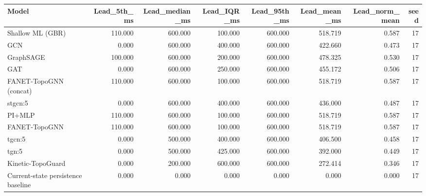 \begin{tabular}{lrrrrrrr}
\toprule
Model & Lead\_5th\_ms & Lead\_median\_ms & Lead\_IQR\_ms & Lead\_95th\_ms & Lead\_mean\_ms & Lead\_norm\_mean & seed \\
\midrule
Shallow ML (GBR) & 110.000 & 600.000 & 100.000 & 600.000 & 518.719 & 0.587 & 17 \\
GCN & 0.000 & 600.000 & 400.000 & 600.000 & 422.660 & 0.473 & 17 \\
GraphSAGE & 100.000 & 600.000 & 200.000 & 600.000 & 478.325 & 0.530 & 17 \\
GAT & 0.000 & 600.000 & 250.000 & 600.000 & 455.172 & 0.506 & 17 \\
FANET-TopoGNN (concat) & 110.000 & 600.000 & 100.000 & 600.000 & 518.719 & 0.587 & 17 \\
stgcn:5 & 0.000 & 600.000 & 400.000 & 600.000 & 436.000 & 0.487 & 17 \\
PI+MLP & 110.000 & 600.000 & 100.000 & 600.000 & 518.719 & 0.587 & 17 \\
FANET-TopoGNN & 110.000 & 600.000 & 100.000 & 600.000 & 518.719 & 0.587 & 17 \\
tgcn:5 & 0.000 & 500.000 & 400.000 & 600.000 & 406.500 & 0.458 & 17 \\
tgn:5 & 0.000 & 500.000 & 425.000 & 600.000 & 392.000 & 0.449 & 17 \\
Kinetic-TopoGuard & 0.000 & 200.000 & 600.000 & 600.000 & 272.414 & 0.346 & 17 \\
Current-state persistence baseline & 0.000 & 0.000 & 0.000 & 0.000 & 0.000 & 0.000 & 17 \\
\bottomrule
\end{tabular}